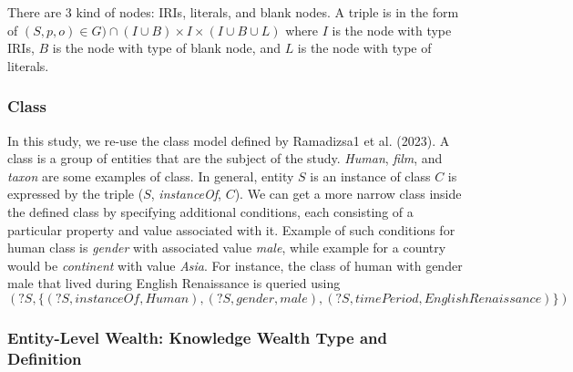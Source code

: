 \documentclass[
]{ceurart}
\begin{document}
There are 3 kind of nodes: IRIs, literals, and blank nodes. A triple is in the form of \((S, p, o) ∈ G) \cap (I \cup B) \times I \times (I \cup B \cup L) \) where \(I\) is the node with type IRIs, \(B\) is the node with type of blank node, and \(L\) is the node with type of literals.

\subsubsection{Class}
In this study, we re-use the class model defined by Ramadizsa1 et al. (2023). A class is a group of entities that are the subject of the study. \textit{Human}, \textit{film}, and \textit{taxon} are some examples of class. In general, entity \(S\) is an instance of class \(C\) is expressed by the triple (\(S\), \textit{instanceOf}, \(C\)). We can get a more narrow class inside the defined class by specifying additional conditions, each consisting of a particular property and value associated with it. Example of such conditions for human class is \textit{gender} with associated value \textit{male}, while example for a country would be \textit{continent} with value \textit{Asia}. For instance, the class of human with gender male that lived during English Renaissance is queried using
\[
    (?S, \{(?S, instanceOf, Human), (?S, gender, male), (?S, timePeriod, EnglishRenaissance)\})
\]

\subsubsection{Entity-Level Wealth: Knowledge Wealth Type and Definition}
\end{document}
